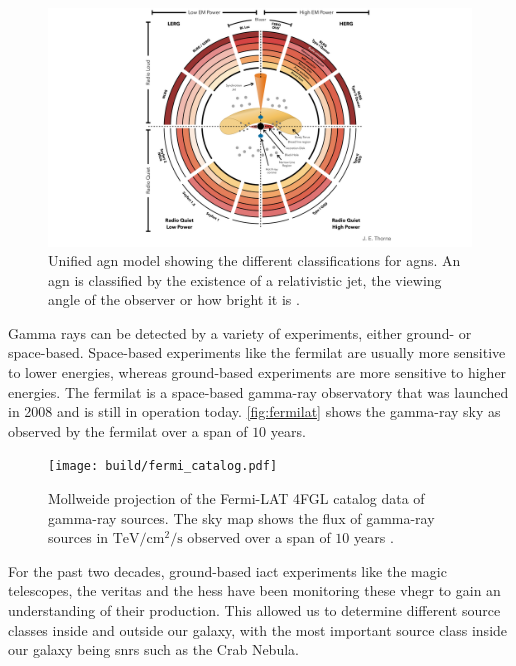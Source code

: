 \begin{figure}
    \centering
    \includegraphics[width=\textwidth]{graphics/agn.pdf}
    \caption{Unified \gls{agn} model showing the different classifications for \glspl{agn}.
    An \gls{agn} is classified by the existence of a relativistic jet, the viewing angle of the observer
    or how bright it is \cite{agn_diagram}.}
    \label{fig:agn}
\end{figure}

Gamma rays can be detected by a variety of experiments, either ground- or space-based. Space-based
experiments like the \gls{fermilat} are usually more sensitive to lower energies, whereas ground-based experiments are more
sensitive to higher energies. The \gls{fermilat} is a space-based gamma-ray observatory that was launched
in 2008 and is still in operation today. \autoref{fig:fermilat} shows the gamma-ray sky as observed by the
\gls{fermilat} over a span of \(\num{10}\) years.

\begin{figure}
    \centering
    \texttt{[image: build/fermi\_catalog.pdf]}
    \caption{Mollweide projection of the Fermi-LAT 4FGL catalog data of gamma-ray sources. The sky map
    shows the flux of gamma-ray sources in \(\si{\tera\eV\per\centi\meter\squared\per\second}\)
    observed over a span of \(\num{10}\) years \cite{fermi4fgl}.}
    \label{fig:fermilat}
\end{figure}

For the past two decades, ground-based \gls{iact} experiments like the \gls{magic} telescopes, the
\gls{veritas} and the \gls{hess} have been monitoring these \gls{vhegr} to gain an understanding of
their production. This allowed us to determine different source classes inside and outside our galaxy,
with the most important source class inside our galaxy being \glspl{snr} such as the Crab Nebula.





